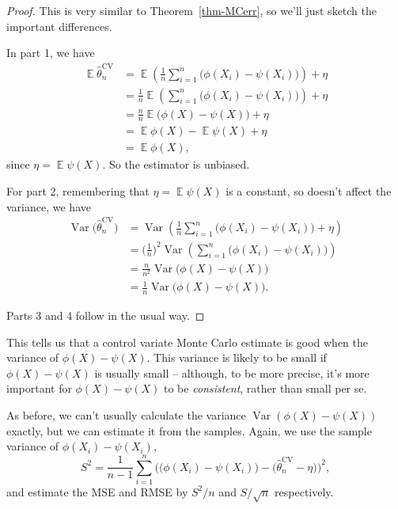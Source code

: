 \documentclass[
  letterpaper,
  DIV=11,
  numbers=noendperiod]{scrreprt}
\newcommand{\Exg}{\operatorname{\mathbb{E}}}
\newcommand{\Var}{\operatorname{Var}}
\theoremstyle{plain}
\theoremstyle{definition}
\theoremstyle{definition}
\theoremstyle{remark}
\begin{document}
\begin{proof}
This is very similar to Theorem~\ref{thm-MCerr}, so we'll just sketch
the important differences.

In part 1, we have \begin{align*}
\Exg \widehat{\theta}_n^{\mathrm{CV}}
  &= \Exg \left(\frac{1}{n} \sum_{i=1}^n \big(\phi(X_i) - \psi(X_i)\big)\right) + \eta \\
  &= \frac{1}{n}\Exg \left(\sum_{i=1}^n \big(\phi(X_i) - \psi(X_i)\big)\right) + \eta \\
  &= \frac{n}{n}\Exg\big(\phi(X) - \psi(X)\big) + \eta \\
  &= \Exg\phi(X) - \Exg\psi(X) + \eta \\
  &= \Exg\phi(X) ,
\end{align*} since \(\eta = \Exg\psi(X)\). So the estimator is unbiased.

For part 2, remembering that \(\eta = \Exg \psi(X)\) is a constant, so
doesn't affect the variance, we have \begin{align*}
\Var \big(\widehat{\theta}_n^{\mathrm{CV}}\big)
&= \Var \left(\frac{1}{n} \sum_{i=1}^n \big(\phi(X_i) - \psi(X_i)\big) + \eta \right) \\
&= \Big( \frac{1}{n}\Big)^2 \Var \left(\sum_{i=1}^n \big(\phi(X_i) - \psi(X_i)\big) \right) \\
&= \frac{n}{n^2} \Var \big(\phi(X) - \psi(X)\big) \\
&= \frac{1}{n} \Var \big(\phi(X) - \psi(X)\big) .
\end{align*}

Parts 3 and 4 follow in the usual way.
\end{proof}

This tells us that a control variate Monte Carlo estimate is good when
the variance of \(\phi(X) - \psi(X)\). This variance is likely to be
small if \(\phi(X) - \psi(X)\) is usually small -- although, to be more
precise, it's more important for \(\phi(X) - \psi(X)\) to be
\emph{consistent}, rather than small per se.

As before, we can't usually calculate the variance
\(\Var(\phi(X) - \psi(X))\) exactly, but we can estimate it from the
samples. Again, we use the sample variance of \(\phi(X_i) - \psi(X_i)\),
\[S^2 = \frac{1}{n-1}\sum_{i=1}^n \Big(\big(\phi(X_i) - \psi(X_i)\big) - \big(\widehat\theta_n^{\mathrm{CV}} - \eta\big)\Big)^2 , \]
and estimate the MSE and RMSE by \(S^2 / n\) and \(S / \sqrt{n}\)
respectively.
\end{document}
